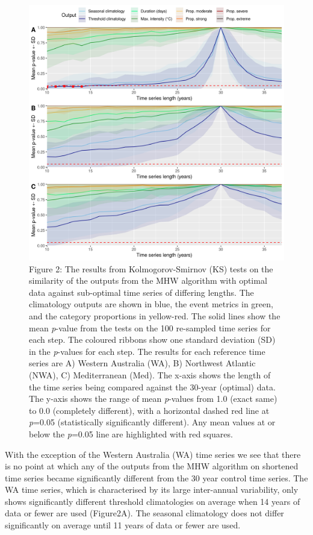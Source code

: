 \documentclass[]{article}
\begin{document}
\begin{figure}
\centering
\includegraphics{../LaTeX/fig_2.png}
\caption{Figure 2: The results from Kolmogorov-Smirnov (KS) tests on the
similarity of the outputs from the MHW algorithm with optimal data
against sub-optimal time series of differing lengths. The climatology
outputs are shown in blue, the event metrics in green, and the category
proportions in yellow-red. The solid lines show the mean \emph{p}-value
from the tests on the 100 re-sampled time series for each step. The
coloured ribbons show one standard deviation (SD) in the \emph{p}-values
for each step. The results for each reference time series are A) Western
Australia (WA), B) Northwest Atlantic (NWA), C) Mediterranean (Med). The
x-axis shows the length of the time series being compared against the
30-year (optimal) data. The y-axis shows the range of mean
\emph{p}-values from 1.0 (exact same) to 0.0 (completely different),
with a horizontal dashed red line at \emph{p}=0.05 (statistically
significantly different). Any mean values at or below the \emph{p}=0.05
line are highlighted with red squares.}
\end{figure}

With the exception of the Western Australia (WA) time series we see that
there is no point at which any of the outputs from the MHW algorithm on
shortened time series became significantly different from the 30 year
control time series. The WA time series, which is characterised by its
large inter-annual variability, only shows significantly different
threshold climatologies on average when 14 years of data or fewer are
used (Figure2A). The seasonal climatology does not differ significantly
on average until 11 years of data or fewer are used.
\end{document}
